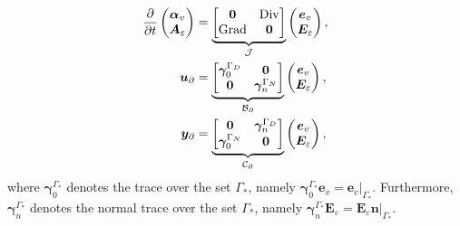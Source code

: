 \begin{equation}\label{eq:phsysElas}
\begin{aligned}
\displaystyle
\diffp{}{t}
\begin{pmatrix}
\bm{\alpha}_v \\
\bm{A}_\varepsilon
\end{pmatrix} &= \underbrace{
\begin{bmatrix}
\bm{0} & \Div \\
\Grad & \bm{0} \\
\end{bmatrix}}_{\mathcal{J}}
\begin{pmatrix}
\bm{e}_v \\
\bm{E}_\varepsilon
\end{pmatrix}, \vspace{3pt}\\
\bm{u}_\partial &= \underbrace{
	\begin{bmatrix}
	\bm\gamma_{0}^{\Gamma_D} & \bm{0} \\
	\bm{0} & \bm\gamma_n^{\Gamma_N} \\
	\end{bmatrix}}_{\mathcal{B}_\partial} \begin{pmatrix}
\bm{e}_v \\
\bm{E}_\varepsilon
\end{pmatrix}, \vspace{3pt}\\
\bm{y}_\partial &= \underbrace{
\begin{bmatrix}
\bm{0} & \bm\gamma_{n}^{\Gamma_D} \\
\bm\gamma_0^{\Gamma_N} & \bm{0} \\
\end{bmatrix}}_{\mathcal{C}_\partial}
\begin{pmatrix}
\bm{e}_v \\
\bm{E}_\varepsilon
\end{pmatrix},
\end{aligned}
\end{equation}
where $\bm\gamma_{0}^{\Gamma_*}$ denotes the trace over the set $\Gamma_*$, namely $\bm\gamma_{0}^{\Gamma_*}\bm{e}_v = \bm{e}_v\vert_{\Gamma_*}$. Furthermore, $\bm\gamma_{n}^{\Gamma_*}$ denotes the normal trace over the set $\Gamma_*$, namely $\bm\gamma_{n}^{\Gamma_*}\bm{E}_\varepsilon = \bm{E}_\varepsilon \bm{n}\vert_{\Gamma_*}$.

